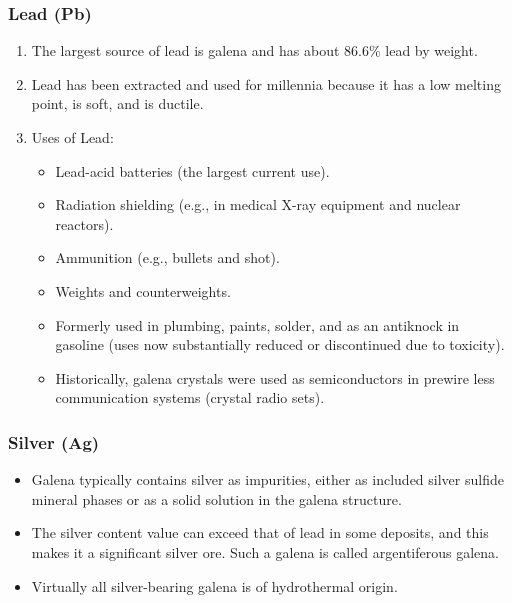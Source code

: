 \documentclass[12pt,a4paper, top=1.9cm, bottom=2.03cm, left=3.81cm, right=1.9cm]{article}
\begin{document}
\subsubsection{Lead (Pb)}
\begin{enumerate}[label=\arabic*.]  %
    \item The largest source of lead is galena and has about 86.6\% lead by weight.
    \item Lead has been extracted and used for millennia because it has a low melting point, is soft, and is ductile.
    \item Uses of Lead:
    \begin{itemize}[label=\textbullet]  %
    \item Lead-acid batteries (the largest current use).
    \item Radiation shielding (e.g., in medical X-ray equipment and nuclear reactors).
    \item Ammunition (e.g., bullets and shot).
    \item Weights and counterweights.
    \item Formerly used in plumbing, paints, solder, and as an antiknock in gasoline (uses now substantially reduced or discontinued due to toxicity).
    \item Historically, galena crystals were used as semiconductors in prewire less communication systems (crystal radio sets).
    \end{itemize}
\end{enumerate}
\subsubsection{Silver (Ag)}
\begin{itemize}[label=\textbullet]  %
    \item Galena typically contains silver as impurities, either as included silver sulfide mineral phases or as a solid solution in the galena structure.
    \item The silver content value can exceed that of lead in some deposits, and this makes it a significant silver ore. Such a galena is called argentiferous galena.
    \item Virtually all silver-bearing galena is of hydrothermal origin.
\end{itemize}
\end{document}
